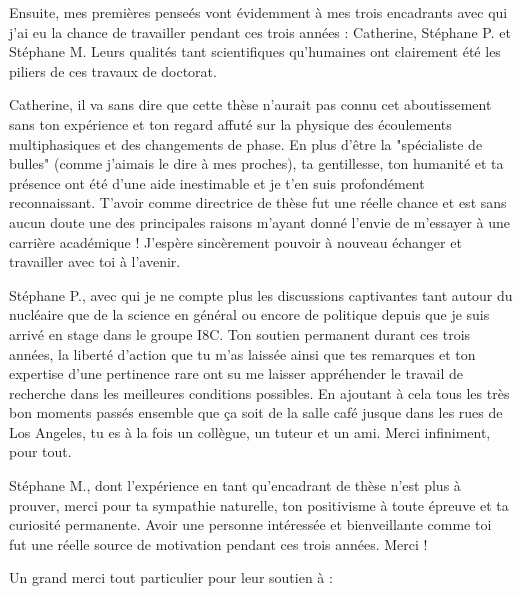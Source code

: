\npar

Ensuite, mes premières penseés vont évidemment à mes trois encadrants avec qui j'ai eu la chance de travailler pendant ces trois années : Catherine, Stéphane P. et Stéphane M. Leurs qualités tant scientifiques qu'humaines ont clairement été les piliers de ces travaux de doctorat.

\npar
Catherine, il va sans dire que cette thèse n'aurait pas connu cet aboutissement sans ton expérience et ton regard affuté sur la physique des écoulements multiphasiques et des changements de phase. En plus d'être la "spécialiste de bulles" (comme j'aimais le dire à mes proches), ta gentillesse, ton humanité et ta présence ont été d'une aide inestimable et je t'en suis profondément reconnaissant. T'avoir comme directrice de thèse fut une réelle chance et est sans aucun doute une des principales raisons m'ayant donné l'envie de m'essayer à une carrière académique ! J'espère sincèrement pouvoir à nouveau échanger et travailler avec toi à l'avenir.

\npar

Stéphane P., avec qui je ne compte plus les discussions captivantes tant autour du nucléaire que de la science en général ou encore de politique depuis que je suis arrivé en stage dans le groupe I8C.  Ton soutien permanent durant ces trois années, la liberté d'action que tu m'as laissée ainsi que tes remarques et ton expertise d'une pertinence rare ont su me laisser appréhender le travail de recherche dans les meilleures conditions possibles. En ajoutant à cela tous les très bon moments passés ensemble que ça soit de la salle café jusque dans les rues de Los Angeles, tu es à la fois un collègue, un tuteur et un ami. Merci infiniment, pour tout.

\npar

Stéphane M., dont l'expérience en tant qu'encadrant de thèse n'est plus à prouver, merci pour ta sympathie naturelle, ton positivisme à toute épreuve et ta curiosité permanente. Avoir une personne intéressée et bienveillante comme toi fut une réelle source de motivation pendant ces trois années. Merci !

\npar

Un grand merci tout particulier pour leur soutien à :

